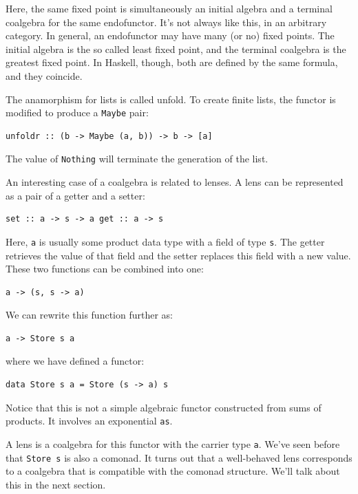 Here, the same fixed point is simultaneously an initial algebra and a
terminal coalgebra for the same endofunctor. It's not always like this,
in an arbitrary category. In general, an endofunctor may have many (or
no) fixed points. The initial algebra is the so called least fixed
point, and the terminal coalgebra is the greatest fixed point. In
Haskell, though, both are defined by the same formula, and they
coincide.

The anamorphism for lists is called unfold. To create finite lists, the
functor is modified to produce a \texttt{Maybe} pair:

\begin{verbatim}
unfoldr :: (b -> Maybe (a, b)) -> b -> [a]
\end{verbatim}

The value of \texttt{Nothing} will terminate the generation of the list.

An interesting case of a coalgebra is related to lenses. A lens can be
represented as a pair of a getter and a setter:

\begin{verbatim}
set :: a -> s -> a get :: a -> s
\end{verbatim}

Here, \texttt{a} is usually some product data type with a field of type
\texttt{s}. The getter retrieves the value of that field and the setter
replaces this field with a new value. These two functions can be
combined into one:

\begin{verbatim}
a -> (s, s -> a)
\end{verbatim}

We can rewrite this function further as:

\begin{verbatim}
a -> Store s a
\end{verbatim}

where we have defined a functor:

\begin{verbatim}
data Store s a = Store (s -> a) s
\end{verbatim}

Notice that this is not a simple algebraic functor constructed from sums
of products. It involves an exponential \texttt{as}.

A lens is a coalgebra for this functor with the carrier type \texttt{a}.
We've seen before that \texttt{Store\ s} is also a comonad. It turns out
that a well-behaved lens corresponds to a coalgebra that is compatible
with the comonad structure. We'll talk about this in the next section.

